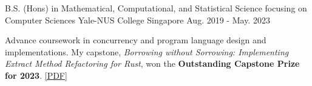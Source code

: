 

\begin{cventries}

  \cventry
    {B.S. (Hons) in Mathematical, Computational, and Statistical Science focusing on Computer Sciences} %
    {Yale-NUS College} %
    {Singapore} %
    {Aug. 2019 - May. 2023} %
    {
      \begin{cvitems} %
        \item {Advance coursework in concurrency and program language design and implementations.  My capstone, \textit{Borrowing without Sorrowing: Implementing Extract Method Refactoring for Rust}, won the \textbf{Outstanding Capstone Prize for 2023}. \href{https://fastmail-resource.sewenthy.dev/public/academics/bsc_capstone_borrowing_without_sorrowing.pdf}{[PDF]}}
      \end{cvitems}
    }

\end{cventries}
